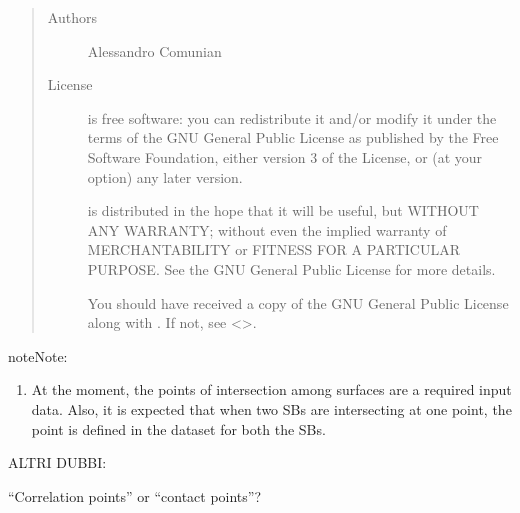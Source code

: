 \documentclass[letterpaper,10pt,english]{sphinxmanual}
\begin{document}
\begin{quote}
\begin{description}
\begin{description}
\end{description}

\item[{Authors}] \leavevmode
Alessandro Comunian

\item[{License}] \leavevmode
{} is free software: you can redistribute it and/or modify
it under the terms of the GNU General Public License as published by
the Free Software Foundation, either version 3 of the License, or
(at your option) any later version.

 is distributed in the hope that it will be useful,
but WITHOUT ANY WARRANTY; without even the implied warranty of
MERCHANTABILITY or FITNESS FOR A PARTICULAR PURPOSE.  See the
GNU General Public License for more details.

You should have received a copy of the GNU General Public License
along with .  If not, see \textless{}\textgreater{}.

\end{description}\end{quote}

\begin{sphinxadmonition}{note}{Note:}\begin{enumerate}
\def\theenumi{\arabic{enumi}}
\def\labelenumi{\theenumi )}
\makeatletter\def\p@enumii{\p@enumi \theenumi )}\makeatother
\item {} 
At the moment, the points of intersection among surfaces are a
required input data. Also, it is expected that when two SBs are
intersecting at one point, the point is defined in the dataset
for both the SBs.

\end{enumerate}
\end{sphinxadmonition}

ALTRI DUBBI:

“Correlation points” or “contact points”?
\end{document}
